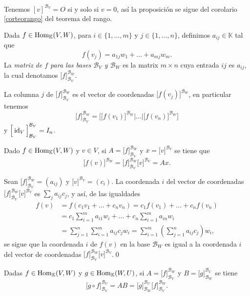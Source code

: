 \dem Tenemos $\left[ v \right]^{\mathcal{B}_V}=O$ si y solo si $v=0$, as\'i la proposici\'on se sigue del corolario \ref{corteorango} del teorema del rango. 

\begin{defn}
Dada $f\in\operatorname{Hom}_{\mathbb{K}}(V,W)$, para $i\in\{1,\ldots,m\}$ y $j\in\{1,\ldots,n\}$, definimos $a_{ij}\in \mathbb{K}$ tal que
$$f(v_j)=a_{1j}w_1+\ldots+a_{mj}w_m.$$
La \emph{matriz de $f$ para las bases $\mathcal{B}_V$ y $\mathcal{B}_W$} es la matrix $m\times n$ cuya entrada $ij$ es $a_{ij}$, la cual denotamos $\Big[ f \Big]^{\mathcal{B}_W}_{\mathcal{B}_V}$.
\end{defn}

\begin{obs}
La columna $j$ de $\Big[ f \Big]^{\mathcal{B}_W}_{\mathcal{B}_V}$ es el vector de coordenadas $\Big[f(v_j)\Big]^{\mathcal{B}_W}$, en particular tenemos 
$$\Big[f\Big]^{\mathcal{B}_W}_{\mathcal{B}_V}=\Bigg[\Big[ f(v_1)\Big]^{\mathcal{B}_W}\Big|\ldots \Big| \Big[ f(v_n)\Big]^{\mathcal{B}_W}\Bigg]$$
y $\Big[\operatorname{id}_V\Big]^{\mathcal{B}_V}_{\mathcal{B}_V}=I_n$.
\end{obs}

\begin{prop}
Dado $f\in\operatorname{Hom}_{\mathbb{K}}(V,W)$ y $v\in V$, si $A=\Big[ f \Big]^{\mathcal{B}_W}_{\mathcal{B}_V}$ y $\overline{x}=\Big[ v \Big]^{\mathcal{B}_V}$ se tiene que
$$\Big[ f(v)\Big]^{\mathcal{B}_W}=\Big[ f \Big]^{\mathcal{B}_W}_{\mathcal{B}_V}\Big[ v \Big]^{\mathcal{B}_V}=Ax.$$
\end{prop}

\dem Sean $\Big[ f \Big]^{\mathcal{B}_W}_{\mathcal{B}_V}=(a_{ij})$ y $\Big[v\Big]^{\mathcal{B}_V}=(c_i)$. La coordenada $i$ del vector de coordenadas $\Big[ f \Big]^{\mathcal{B}_W}_{\mathcal{B}_V}\Big[ v \Big]^{\mathcal{B}_V}$ es $\sum_j a_{ij}c_j$, y as\'i, de las igualdades
\begin{align*}
f(v) & = f(c_1v_1+\ldots+c_nv_n)=c_1f(v_1)+\ldots+c_nf(v_n)\\
 & = c_1\sum_{i=1}^m a_{i1}w_i+\ldots+c_n\sum_{i=1}^m a_{in}w_i\\
 & = \sum_{j=1}^n\sum_{i=1}^m a_{ij}c_jw_i=\sum_{i=1}^m\left(\sum_{j=1}^n a_{ij}c_j\right)w_i,
\end{align*}
se sigue que la coordenada $i$ de $f(v)$ en la base $\mathcal{B}_W$ es igual a la coordenada $i$ del vector de coordenadas  $\Big[ f \Big]^{\mathcal{B}_W}_{\mathcal{B}_V}\Big[ v \Big]^{\mathcal{B}_V}$.\qed

\begin{prop}\label{compmult}
Dadas $f\in\operatorname{Hom}_{\mathbb{K}}(V,W)$ y $g\in\operatorname{Hom}_{\mathbb{K}}(W,U)$, si $A=\Big[ f \Big]^{\mathcal{B}_W}_{\mathcal{B}_V}$ y $B=\Big[ g \Big]^{\mathcal{B}_U}_{\mathcal{B}_W}$ se tiene
$$
\Big[ g\circ f \Big]^{\mathcal{B}_U}_{\mathcal{B}_V}=AB=\Big[ g \Big]^{\mathcal{B}_U}_{\mathcal{B}_W}\Big[ f \Big]^{\mathcal{B}_W}_{\mathcal{B}_V}.
$$
\end{prop}

